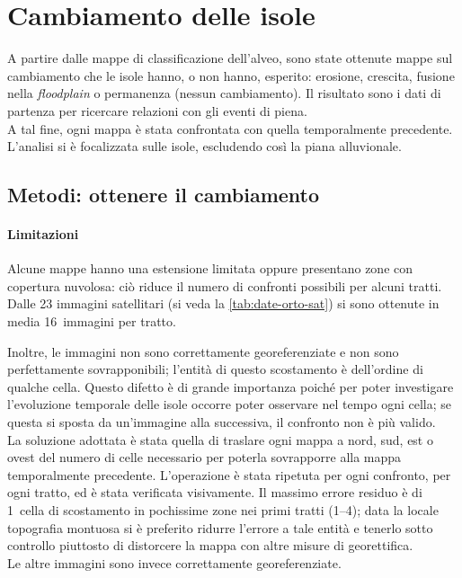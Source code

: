 \section{Cambiamento delle isole}
A partire dalle mappe di classificazione dell'alveo, sono state ottenute mappe sul cambiamento che le isole hanno, o non hanno, esperito: erosione, crescita, fusione nella \emph{floodplain} o permanenza (nessun cambiamento).
Il risultato sono i dati di partenza per ricercare relazioni con gli eventi di piena.
\\
A tal fine, ogni mappa è stata confrontata con quella temporalmente precedente.
\\
L'analisi si è focalizzata sulle isole, escludendo così la piana alluvionale.

\subsection{Metodi: ottenere il cambiamento}
\paragraph{Limitazioni} \label{par:camb-limiti}
Alcune mappe hanno una estensione limitata oppure presentano zone con copertura nuvolosa: ciò riduce il numero di confronti possibili per alcuni tratti. 
Dalle 23 immagini satellitari (si veda la \vref{tab:date-orto-sat}) si sono ottenute in media 16~immagini per tratto.

Inoltre, le immagini \AST{} non sono correttamente georeferenziate e non sono perfettamente sovrapponibili; l'entità di questo scostamento è dell'ordine di qualche cella.
Questo difetto è di grande importanza poiché per poter investigare l'evoluzione temporale delle isole occorre poter osservare nel tempo ogni cella; se questa si sposta da un'immagine alla successiva, il confronto non è più valido.
\\
La soluzione adottata è stata quella di traslare ogni mappa a nord, sud, est o ovest del numero di celle necessario per poterla sovrapporre alla mappa temporalmente precedente.
L'operazione è stata ripetuta per ogni confronto, per ogni tratto, ed è stata verificata visivamente.
Il massimo errore residuo è di 1~cella di scostamento in pochissime zone nei primi tratti (\numrange[range-phrase={ - }]{1}{4}); data la locale topografia montuosa si è preferito ridurre l'errore a tale entità e tenerlo sotto controllo piuttosto di distorcere la mappa con altre misure di georettifica.
\\
Le altre immagini sono invece correttamente georeferenziate.

